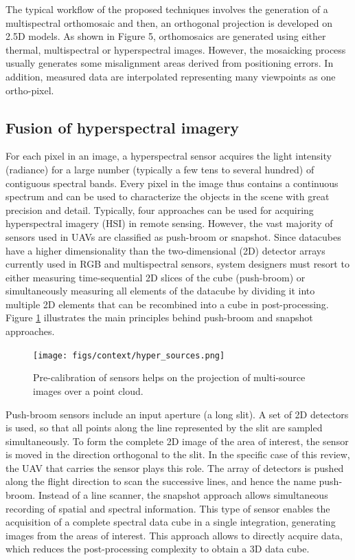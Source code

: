The typical workflow of the proposed techniques involves the generation of a multispectral orthomosaic and then, an orthogonal projection is developed on 2.5D models. As shown in Figure 5, orthomosaics are generated using either thermal, multispectral or hyperspectral images. However, the mosaicking process usually generates some misalignment areas derived from positioning errors. In addition, measured data are interpolated representing many viewpoints as one ortho-pixel.

\subsection{Fusion of hyperspectral imagery}

For each pixel in an image, a hyperspectral sensor acquires the light intensity (radiance) for a large number (typically a few tens to several hundred) of contiguous spectral bands. Every pixel in the image thus contains a continuous spectrum and can be used to characterize the objects in the scene with great precision and detail. Typically, four approaches can be used for acquiring hyperspectral imagery (HSI) in remote sensing. However, the vast majority of sensors used in UAVs are classified as push-broom or snapshot. Since datacubes have a higher dimensionality than the two-dimensional (2D) detector arrays currently used in RGB and multispectral sensors, system designers must resort to either measuring time-sequential 2D slices of the cube (push-broom) or simultaneously measuring all elements of the datacube by dividing it into multiple 2D elements that can be recombined into a cube in post-processing. Figure \ref{fig:hyper_sources} illustrates the main principles behind push-broom and snapshot approaches.

\begin{figure}[!ht]
	\texttt{[image: figs/context/hyper\_sources.png]}
	\caption{Pre-calibration of sensors helps on the projection of multi-source images over a point cloud.}
    \label{fig:hyper_sources}
\end{figure}

Push-broom sensors include an input aperture (a long slit). A set of 2D detectors is used, so that all points along the line represented by the slit are sampled simultaneously. To form the complete 2D image of the area of interest, the sensor is moved in the direction orthogonal to the slit. In the specific case of this review, the UAV that carries the sensor plays this role. The array of detectors is pushed along the flight direction to scan the successive lines, and hence the name push-broom. Instead of a line scanner, the snapshot approach allows simultaneous recording of spatial and spectral information. This type of sensor enables the acquisition of a complete spectral data cube in a single integration, generating images from the areas of interest. This approach allows to directly acquire data, which reduces the post-processing complexity to obtain a 3D data cube. 

